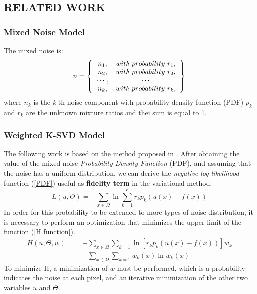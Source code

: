 \subsection{RELATED WORK}
\subsubsection{Mixed Noise Model}
The mixed noise is:
\begin{equation}
    n = \left\{ \\
    \begin{array}{cc}
        n_1, & with~probability~r_1,\\
        n_2, & with~probability~r_2,\\
        \cdots, & \cdots\\
        n_k, & with~probability~r_k,\\ 
    \end{array}
     \right\}
\end{equation}
where $ n_k $ is the \emph{k}-th noise component with probability density function (PDF) 
$ p_k $ and $ r_k $ are the unknown mixture ratios and thei sum is equal to 1.

\subsubsection{Weighted K-SVD Model}
The following work is based on the method proposed in \cite{0884882814}. After obtaining 
the value of the mixed-noise \emph{Probability Density Function} (PDF), and 
assuming that the noise has a uniform distribution, we can derive the \emph{negative 
log-likelihood} function (\ref{PDF}) useful as {\bfseries{fidelity term}} in the variational 
method. 
\begin{equation}\label{PDF}
    L(u,\Theta) = - \sum_{x\in\Omega}\ln\sum_{k=1}^Kr_kp_k(u(x)-f(x))
\end{equation}
In order for this probability to be extended to more types of noise 
distribution, it is necessary to perform an optimization that minimizes the 
upper limit of the function (\ref{H function}). 
\begin{eqnarray}\label{H function}
    H(u,\Theta,w) & = & - \sum_{x\in\Omega}\sum_{k=1}\ln\left[r_kp_k(u(x)-f(x))\right]w_k \nonumber \\
                  &   & + \sum_{x\in\Omega}\sum_{k=1}w_k(x)\ln{w_k(x)}  
\end{eqnarray}
To minimize H, a minimization of $ w $ must be performed, which is a probability 
indicates the noise at each pixel, and an iterative minimization of the other 
two variables $ u $ and $ \Theta $.


